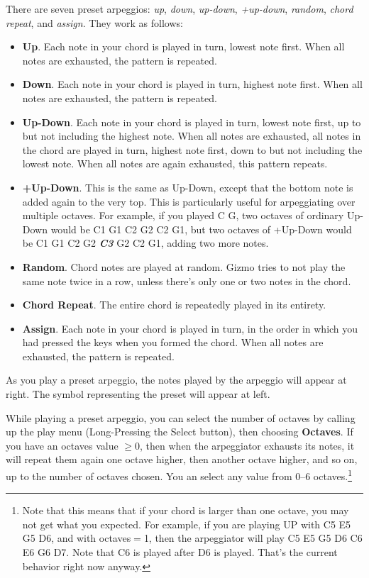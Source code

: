 \documentclass{article}
\begin{document}
There are seven preset arpeggios: {\it up}, {\it down}, {\it up-down}, {\it  +up-down}, {\it random}, {\it chord repeat}, and {\it assign}.  They work as follows:

\begin{itemize}
\item {\bf Up}.  Each note in your chord is played in turn, lowest note first.  When all notes are exhausted, the pattern is repeated.
\item {\bf Down}.  Each note in your chord is played in turn, highest note first.  When all notes are exhausted, the pattern is repeated.
\item {\bf Up-Down}.  Each note in your chord is played in turn, lowest note first, up to but not including the highest note.  When all notes are exhausted, all notes in the chord are played in turn, highest note first, down to but not including the lowest note.  When all notes are again exhausted, this pattern repeats.
\item {\bf  +Up-Down}.  This is the same as Up-Down, except that the bottom note is added again to the very top.  This is particularly useful for arpeggiating over multiple octaves.  For example, if you played C G, two octaves of ordinary Up-Down would be C1 G1 C2 G2 C2 G1, but two octaves of +Up-Down would be C1 G1 C2 G2 \textit{\textbf{C3}} G2 C2 G1, adding two more notes.  
\item {\bf Random}.  Chord notes are played at random.  Gizmo tries to not play the same note twice in a row, unless there's only one or two notes in the chord.
\item {\bf Chord Repeat}.  The entire chord is repeatedly played in its entirety.
\item {\bf Assign}. Each note in your chord is played in turn, in the order in which you had pressed the keys when you formed the chord.  When all notes are exhausted, the pattern is repeated.
\end{itemize}

As you play a preset arpeggio, the notes played by the arpeggio will appear at right.  The symbol representing the preset will appear at left.

While playing a preset arpeggio, you can select the number of octaves by calling up the play menu (Long-Pressing the Select button), then choosing {\bf Octaves}.  If you have an octaves value \(\geq 0\), then when the arpeggiator exhausts its notes, it will repeat them again one octave higher, then another octave higher, and so on, up to the number of octaves chosen. You an select any value from 0--6 octaves.\footnote{Note that this means that if your chord is larger than one octave, you may not get what you expected.  For example, if you are playing UP with C5 E5 G5 D6, and with octaves\(=\)1, then the arpeggiator will play C5 E5 G5 D6 C6 E6 G6 D7.  Note that C6 is played after D6 is played.  That's the current behavior right now anyway.}
\end{document}
